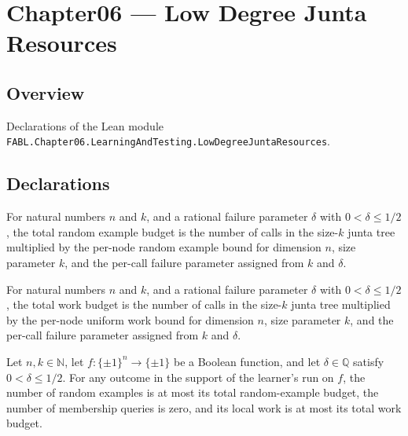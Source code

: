\chapter{Chapter06 — Low Degree Junta Resources}
\section{Overview}

Declarations of the Lean module \texttt{FABL.Chapter06.LearningAndTesting.LowDegreeJuntaResources}.

\section{Declarations}

\begin{definition}
\label{FABL.lowDegreeJuntaTotalRandomExampleBudget}
\leanok
{}
For natural numbers $n$ and $k$, and a rational failure parameter $\delta$ with
$0<\delta\leq 1/2$, the total random example budget is the number of calls in the
size-$k$ junta tree multiplied by the per-node random example bound for dimension $n$,
size parameter $k$, and the per-call failure parameter assigned from $k$ and $\delta$.
\end{definition}

\begin{definition}
\label{FABL.lowDegreeJuntaTotalWorkBudget}
\leanok
{}
For natural numbers $n$ and $k$, and a rational failure parameter $\delta$ with
$0<\delta\leq 1/2$, the total work budget is the number of calls in the size-$k$ junta
tree multiplied by the per-node uniform work bound for dimension $n$, size parameter
$k$, and the per-call failure parameter assigned from $k$ and $\delta$.
\end{definition}

\begin{theorem}
\label{FABL.lowDegreeJuntaLearnerProgram_cost_le_totalBudget}
\leanok
{}
Let $n,k\in\mathbb{N}$, let $f:\{\pm1\}^n\to\{\pm1\}$ be a Boolean function, and let
$\delta\in\mathbb{Q}$ satisfy $0<\delta\le 1/2$. For any outcome in the support of the
learner's run on $f$, the number of random examples is at most its total random-example
budget, the number of membership queries is zero, and its local work is at most its
total work budget.
\end{theorem}

